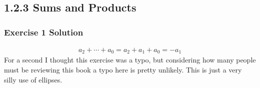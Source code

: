 \subsection{1.2.3 Sums and Products}
\subsubsection*{Exercise 1 Solution}
\begin{align*}
a_2 + \cdots + a_0 = a_2 + a_1 + a_0 = -a_1
\end{align*}
For a second I thought this exercise was a typo, but considering how many
people must be reviewing this book a typo here is pretty unlikely. This is just
a very silly use of ellipses.
